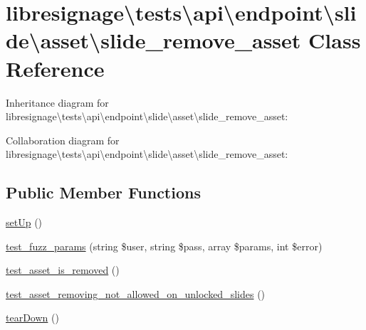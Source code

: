 \hypertarget{classlibresignage_1_1tests_1_1api_1_1endpoint_1_1slide_1_1asset_1_1slide__remove__asset}{}\section{libresignage\textbackslash{}tests\textbackslash{}api\textbackslash{}endpoint\textbackslash{}slide\textbackslash{}asset\textbackslash{}slide\+\_\+remove\+\_\+asset Class Reference}
\label{classlibresignage_1_1tests_1_1api_1_1endpoint_1_1slide_1_1asset_1_1slide__remove__asset}


Inheritance diagram for libresignage\textbackslash{}tests\textbackslash{}api\textbackslash{}endpoint\textbackslash{}slide\textbackslash{}asset\textbackslash{}slide\+\_\+remove\+\_\+asset\+:


Collaboration diagram for libresignage\textbackslash{}tests\textbackslash{}api\textbackslash{}endpoint\textbackslash{}slide\textbackslash{}asset\textbackslash{}slide\+\_\+remove\+\_\+asset\+:
\subsection*{Public Member Functions}
\begin{DoxyCompactItemize}
\item 
\hyperlink{classlibresignage_1_1tests_1_1api_1_1endpoint_1_1slide_1_1asset_1_1slide__remove__asset_ad0a3149942d2a84492b66c50d1dbaba8}{set\+Up} ()
\item 
\hyperlink{classlibresignage_1_1tests_1_1api_1_1endpoint_1_1slide_1_1asset_1_1slide__remove__asset_a6edba43e697e6b98a8aef827432d2280}{test\+\_\+fuzz\+\_\+params} (string \$user, string \$pass, array \$params, int \$error)
\item 
\hyperlink{classlibresignage_1_1tests_1_1api_1_1endpoint_1_1slide_1_1asset_1_1slide__remove__asset_a1d3de7d04a10a3558b38ec9a5481c439}{test\+\_\+asset\+\_\+is\+\_\+removed} ()
\item 
\hyperlink{classlibresignage_1_1tests_1_1api_1_1endpoint_1_1slide_1_1asset_1_1slide__remove__asset_aafa9a5e32a4ace4b9a83e18e57ddf21d}{test\+\_\+asset\+\_\+removing\+\_\+not\+\_\+allowed\+\_\+on\+\_\+unlocked\+\_\+slides} ()
\item 
\hyperlink{classlibresignage_1_1tests_1_1api_1_1endpoint_1_1slide_1_1asset_1_1slide__remove__asset_ac1b5650e41d63082e93fbed5ba10ec4e}{tear\+Down} ()
\end{DoxyCompactItemize}
